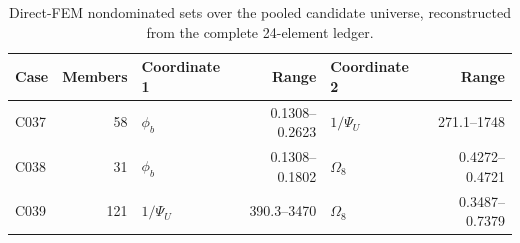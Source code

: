 \begin{table}[t]
\centering
\caption{Direct-FEM nondominated sets over the pooled candidate universe, reconstructed from the complete 24-element ledger.}
\label{tab:physics_front_summary_fast}
\begin{tabular}{lrlrlr}
\toprule
Case & Members & Coordinate 1 & Range & Coordinate 2 & Range \\
\midrule
C037 & 58 & $\phi_b$ & 0.1308--0.2623 & $1/\Psi_U$ & 271.1--1748 \\
C038 & 31 & $\phi_b$ & 0.1308--0.1802 & $\Omega_8$ & 0.4272--0.4721 \\
C039 & 121 & $1/\Psi_U$ & 390.3--3470 & $\Omega_8$ & 0.3487--0.7379 \\
\bottomrule
\end{tabular}
\end{table}
